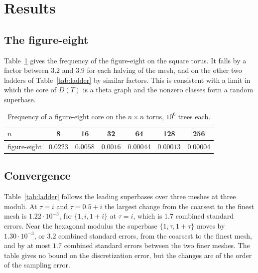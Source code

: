 \documentclass[11pt]{amsart}
\theoremstyle{definition}
\theoremstyle{remark}
\begin{document}
\section{Results}\label{sec:results}

\subsection*{The figure-eight}
Table~\ref{tab:eight} gives the frequency of the figure-eight on the square torus. It falls by a factor between $3.2$
and $3.9$ for each halving of the mesh, and on the other two ladders of Table~\ref{tab:ladder} by similar factors.
This is consistent with a limit in which the core of $D(T)$ is a theta graph and the nonzero classes form a random
superbase.

\begin{table}[tbp]
\centering
\small
\begin{tabular}{lcccccc}
\toprule
$n$ & 8 & 16 & 32 & 64 & 128 & 256\\\midrule
figure-eight & $0.0223$ & $0.0058$ & $0.0016$ & $0.00044$ & $0.00013$ & $0.00004$\\\bottomrule
\end{tabular}
\medskip
\caption{Frequency of a figure-eight core on the $n\times n$ torus, $10^6$ trees each.}
\label{tab:eight}
\end{table}

\subsection*{Convergence}
Table~\ref{tab:ladder} follows the leading superbases over three meshes at three moduli. At $\tau=i$ and $\tau=0.5+i$
the largest change from the coarsest to the finest mesh is $1.22\cdot10^{-3}$, for $\{1,i,1+i\}$ at $\tau=i$, which is
$1.7$ combined standard errors. Near the hexagonal modulus the superbase $\{1,\tau,1+\tau\}$ moves by
$1.30\cdot10^{-3}$, or $3.2$ combined standard errors, from the coarsest to the finest mesh, and by at most $1.7$
combined standard errors between the two finer meshes. The table gives no bound on the discretization error, but the
changes are of the order of the sampling error.
\end{document}
